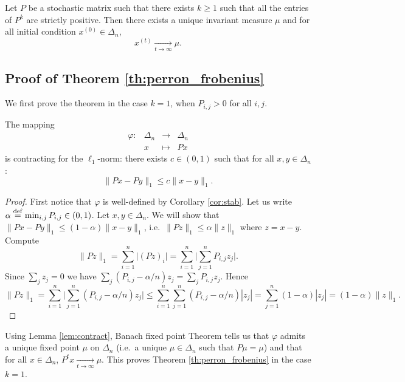 \documentclass[11pt,nocut]{article}
\begin{document}
\begin{corollary}\label{cor:perron}
	Let $P$ be a stochastic matrix such that there exists $k \geq 1$ such that all the entries of $P^k$ are strictly positive. Then there exists a unique invariant measure $\mu$ and for all initial condition $x^{(0)} \in \Delta_n$,
	$$
	x^{(t)} \xrightarrow[t \to \infty]{} \mu.
	$$
\end{corollary}

\subsection{Proof of Theorem \ref{th:perron_frobenius}}
We first prove the theorem in the case $k=1$, when $P_{i,j} > 0$ for all $i,j$.
\begin{lemma}\label{lem:contract}
	The mapping 
	$$
	\begin{array}{cccc}
		\varphi:& \Delta_n &\to& \Delta_n \\
				& x & \mapsto & Px
	\end{array}
	$$
	is contracting for the $\ell_1$-norm: there exists $c \in (0,1)$ such that for all $x,y \in \Delta_n$:
	$$
	\| Px - Py \|_1 \leq c \| x-y\|_1.
	$$
\end{lemma}
\begin{proof}
	First notice that $\varphi$ is well-defined by Corollary \ref{cor:stab}.
	Let us write $\alpha \overset{\rm def}{=} \min_{i,j} P_{i,j} \in (0,1)$.
	Let $x,y \in \Delta_n$. We will show that $\| Px - Py \|_1 \leq (1-\alpha) \| x-y\|_1$, i.e.\ $\|P z\|_1 \leq \alpha \|z\|_1$ where $z = x-y$. Compute
	$$
	\| P z\|_1 
	= \sum_{i=1}^n \big| (Pz)_i \big|
	= \sum_{i=1}^n \Big| \sum_{j=1}^n P_{i,j}z_j \Big|.
	$$
	Since $\sum_{j} z_j = 0$ we have $\sum_j (P_{i,j} - \alpha/n) z_j = \sum_j P_{i,j} z_j$. Hence
	$$
	\| P z\|_1 
	= \sum_{i=1}^n \Big| \sum_{j=1}^n (P_{i,j} - \alpha/n) z_j \Big|
	\leq \sum_{i=1}^n \sum_{j=1}^n (P_{i,j} - \alpha/n) |z_j| 
	= \sum_{j=1}^n (1-\alpha) |z_j|
	= (1-\alpha) \|z\|_1.
	$$
\end{proof}

Using Lemma \ref{lem:contract}, Banach fixed point Theorem tells us that $\varphi$ admits a unique fixed point $\mu$ on $\Delta_n$ (i.e.\ a unique $\mu \in \Delta_n$ such that $P\mu = \mu$) and that for all $x \in \Delta_n$, $P^t x \xrightarrow[t \to \infty]{} \mu$. This proves Theorem \ref{th:perron_frobenius} in the case $k=1$.
\\
\end{document}
